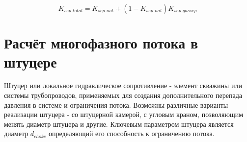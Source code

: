$$K_{sep\_total} = K_{sep\_nat} + (1-K_{sep\_nat}) K_{sep\_gassep}$$


\section{Расчёт многофазного потока в штуцере}


Штуцер или локальное гидравлическое сопротивление - элемент скважины или системы трубопроводов, применяемых для создания дополнительного перепада давления в системе и ограничения потока. 
Возможны различные варианты реализации штуцера - со штуцерной камерой, с угловым краном, позволяющим менять диаметр штуцера и другие.
Ключевым параметром штуцера является диаметр \(d_{choke} \) определяющий его способность к ограничению потока. 



